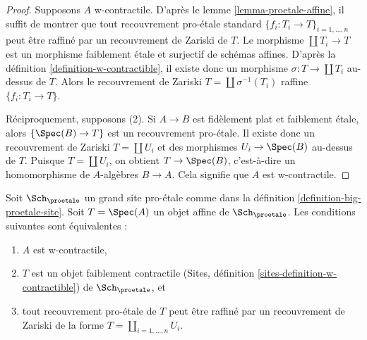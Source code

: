 \begin{proof}
Supposons $A$ w-contractile. D'après le lemme \ref{lemma-proetale-affine},
il suffit de montrer que tout recouvrement pro-\'etale standard
$\{f_i : T_i \to T\}_{i = 1, \ldots, n}$ peut être raffiné par un recouvrement de Zariski de $T$.
Le morphisme $\coprod T_i \to T$ est un morphisme faiblement \'etale et surjectif
de schémas affines. D'après la définition \ref{definition-w-contractible},
il existe donc un morphisme $\sigma : T \to \coprod T_i$ au-dessus de $T$.
Alors le recouvrement de Zariski $T = \coprod \sigma^{-1}(T_i)$
raffine $\{f_i : T_i \to T\}$.

\medskip\noindent
Réciproquement, supposons (2). Si $A \to B$ est fidèlement plat et faiblement \'etale,
alors $\{\Spec(B) \to T\}$ est un recouvrement pro-\'etale.
Il existe donc un recouvrement de Zariski $T = \coprod U_i$
et des morphismes $U_i \to \Spec(B)$ au-dessus de $T$. Puisque $T = \coprod U_i$,
on obtient $T \to \Spec(B)$, c'est-à-dire un homomorphisme de $A$-algèbres $B \to A$.
Cela signifie que $A$ est w-contractile.
\end{proof}

\begin{lemma}
\label{lemma-w-contractible-is-weakly-contractible}
Soit $\Sch_\proetale$ un grand site pro-\'etale comme dans la
définition \ref{definition-big-proetale-site}.
Soit $T = \Spec(A)$ un objet affine de $\Sch_\proetale$.
Les conditions suivantes sont équivalentes :
\begin{enumerate}
\item $A$ est w-contractile,
\item $T$ est un objet faiblement contractile
(Sites, définition \ref{sites-definition-w-contractible})
de $\Sch_\proetale$, et
\item tout recouvrement pro-\'etale de $T$ peut être raffiné par
un recouvrement de Zariski de la forme $T = \coprod_{i = 1, \ldots, n} U_i$.
\end{enumerate}
\end{lemma}

